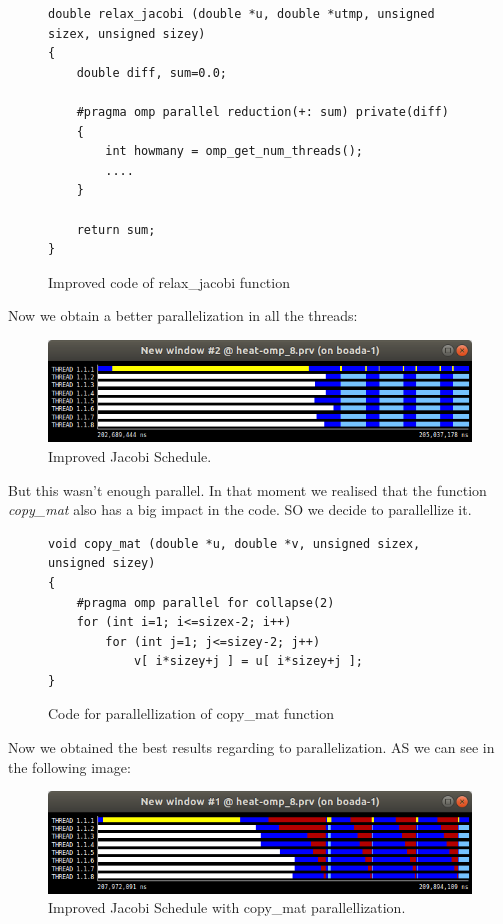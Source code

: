 \documentclass[12pt, a4paper]{article}
\begin{document}
 \begin{figure}[H]
\begin{lstlisting}
double relax_jacobi (double *u, double *utmp, unsigned sizex, unsigned sizey)
{
	double diff, sum=0.0;

	#pragma omp parallel reduction(+: sum) private(diff)
	{
		int howmany = omp_get_num_threads();
		....
	}

    return sum;
}
\end{lstlisting}
\caption{Improved code of relax\_jacobi function}
\end{figure}

Now we obtain a better parallelization in all the threads:

\begin{figure}[H]
	\centering
	\includegraphics[scale=0.50]{./images/paraver-jacobi-s2-3b.png}
	\caption{Improved Jacobi Schedule.}
\end{figure}

But this wasn't enough parallel. In that moment we realised that the function \textit{copy\_mat} also has a big impact in the code. SO we decide to parallellize it.

 \begin{figure}[H]
\begin{lstlisting}
void copy_mat (double *u, double *v, unsigned sizex, unsigned sizey)
{
	#pragma omp parallel for collapse(2)
	for (int i=1; i<=sizex-2; i++)
		for (int j=1; j<=sizey-2; j++) 
			v[ i*sizey+j ] = u[ i*sizey+j ];
}
\end{lstlisting}
\caption{Code for parallellization of copy\_mat function}
\end{figure}

Now we obtained the best results regarding to parallelization. AS we can see in the following image:

\begin{figure}[H]
	\centering
	\includegraphics[scale=0.50]{./images/paraver-jacobi-s2-4.png}
	\caption{Improved Jacobi Schedule with copy\_mat parallellization.}
\end{figure}
\end{document}
